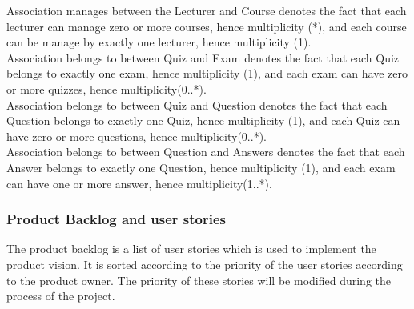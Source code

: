 \documentclass{scrartcl}
\begin{document}
Association manages between the Lecturer and Course denotes the fact that each lecturer can manage zero or more courses, hence multiplicity (*), and each course can be manage by exactly one lecturer, hence multiplicity (1). \\
Association belongs to between Quiz and Exam denotes the fact that each Quiz belongs to exactly one exam, hence multiplicity (1), and each exam can have zero or more quizzes, hence multiplicity(0..*). \\
Association belongs to between Quiz and Question denotes the fact that each Question belongs to exactly one Quiz, hence multiplicity (1), and each Quiz can have zero or more questions, hence multiplicity(0..*). \\
Association belongs to between Question and Answers denotes the fact that each Answer belongs to exactly one Question, hence multiplicity (1), and each exam can have one or more answer, hence multiplicity(1..*). \\
\subsubsection{Product Backlog and user stories}
The product backlog is a list of user stories which is used to implement the product vision. It is sorted according to the priority of the user stories according to the product owner. The priority of these stories will be modified during the process of the project.\\
\end{document}
